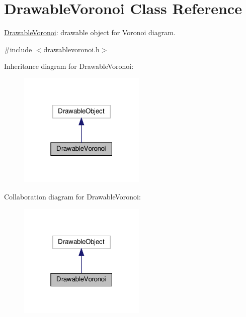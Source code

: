 \hypertarget{classDrawableVoronoi}{}\section{Drawable\+Voronoi Class Reference}
\label{classDrawableVoronoi}


\hyperlink{classDrawableVoronoi}{Drawable\+Voronoi}\+: drawable object for Voronoi diagram.  




{\ttfamily \#include $<$drawablevoronoi.\+h$>$}



Inheritance diagram for Drawable\+Voronoi\+:
\nopagebreak
\begin{figure}[H]
\begin{center}
\leavevmode
\includegraphics[width=171pt]{classDrawableVoronoi__inherit__graph}
\end{center}
\end{figure}


Collaboration diagram for Drawable\+Voronoi\+:
\nopagebreak
\begin{figure}[H]
\begin{center}
\leavevmode
\includegraphics[width=171pt]{classDrawableVoronoi__coll__graph}
\end{center}
\end{figure}
